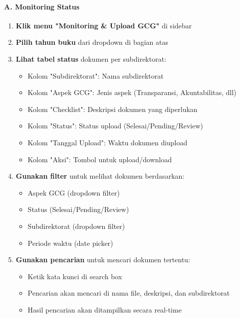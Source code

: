 \documentclass[12pt,a4paper]{article}
\begin{document}
\paragraph{A. Monitoring Status}
\begin{enumerate}
\item \textbf{Klik menu "Monitoring \& Upload GCG"} di sidebar
\item \textbf{Pilih tahun buku} dari dropdown di bagian atas
\item \textbf{Lihat tabel status} dokumen per subdirektorat:
\begin{itemize}
\item Kolom "Subdirektorat": Nama subdirektorat
\item Kolom "Aspek GCG": Jenis aspek (Transparansi, Akuntabilitas, dll)
\item Kolom "Checklist": Deskripsi dokumen yang diperlukan
\item Kolom "Status": Status upload (Selesai/Pending/Review)
\item Kolom "Tanggal Upload": Waktu dokumen diupload
\item Kolom "Aksi": Tombol untuk upload/download
\end{itemize}
\item \textbf{Gunakan filter} untuk melihat dokumen berdasarkan:
\begin{itemize}
\item Aspek GCG (dropdown filter)
\item Status (Selesai/Pending/Review)
\item Subdirektorat (dropdown filter)
\item Periode waktu (date picker)
\end{itemize}
\item \textbf{Gunakan pencarian} untuk mencari dokumen tertentu:
\begin{itemize}
\item Ketik kata kunci di search box
\item Pencarian akan mencari di nama file, deskripsi, dan subdirektorat
\item Hasil pencarian akan ditampilkan secara real-time
\end{itemize}
\end{enumerate}
\end{document}
